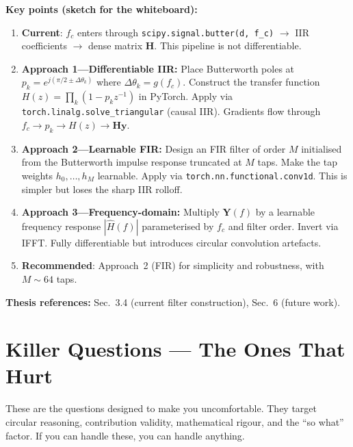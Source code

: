 \documentclass[11pt, letterpaper]{article}
\begin{document}
\begin{answerbox}
\textbf{Key points (sketch for the whiteboard):}
\begin{enumerate}[nosep]
  \item \textbf{Current}: $f_c$ enters through
        \texttt{scipy.signal.butter(d, f\_c)} $\to$ IIR coefficients
        $\to$ dense matrix $\mathbf{H}$.  This pipeline is not
        differentiable.
  \item \textbf{Approach 1---Differentiable IIR:} Place Butterworth
        poles at $p_k = e^{j(\pi/2 \pm \Delta\theta_k)}$ where
        $\Delta\theta_k = g(f_c)$.  Construct the transfer function
        $H(z) = \prod_k (1 - p_k z^{-1})$ in PyTorch.  Apply via
        \texttt{torch.linalg.solve\_triangular} (causal IIR).
        Gradients flow through $f_c \to p_k \to H(z) \to
        \mathbf{H}\mathbf{y}$.
  \item \textbf{Approach 2---Learnable FIR:} Design an FIR filter
        of order $M$ initialised from the Butterworth impulse
        response truncated at $M$ taps.  Make the tap weights
        $h_0, \ldots, h_M$ learnable.  Apply via
        \texttt{torch.nn.functional.conv1d}.  This is simpler but
        loses the sharp IIR rolloff.
  \item \textbf{Approach 3---Frequency-domain:} Multiply
        $\mathbf{Y}(f)$ by a learnable frequency response
        $|\hat{H}(f)|$ parameterised by $f_c$ and filter order.
        Invert via IFFT.  Fully differentiable but introduces
        circular convolution artefacts.
  \item \textbf{Recommended}: Approach~2 (FIR) for simplicity and
        robustness, with $M \sim 64$ taps.
\end{enumerate}
\textbf{Thesis references:} Sec.~3.4 (current filter construction), Sec.~6 (future work).
\end{answerbox}


\newpage
\section{Killer Questions --- The Ones That Hurt}

\begin{tcolorbox}[
  enhanced,
  colback=WarnBG,
  colframe=WarnFrame,
  fonttitle=\bfseries\sffamily,
  title={Warning},
  coltitle=white,
  attach boxed title to top left={yshift=-2mm, xshift=4mm},
  boxed title style={colback=WarnFrame, colframe=WarnFrame, sharp corners, size=small},
  left=4pt, right=4pt, top=4pt, bottom=4pt
]
These are the questions designed to make you uncomfortable.  They target
circular reasoning, contribution validity, mathematical rigour, and the
``so what'' factor.  If you can handle these, you can handle anything.
\end{tcolorbox}
\end{document}
